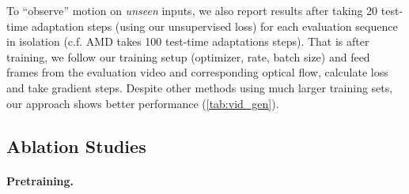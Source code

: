To ``observe'' motion on \emph{unseen} inputs, we also report results after taking 20 test-time adaptation steps (using our unsupervised loss) for each evaluation sequence in isolation (c.f. AMD \cite{liu2021emergence} takes 100 test-time adaptations steps). That is after training, 
we follow our training setup (optimizer, rate, batch size) and feed frames from the evaluation video and corresponding optical flow, calculate loss and take gradient steps. 
Despite other methods using much larger training sets, our approach shows better performance (\cref{tab:vid_gen}). 



\subsection{Ablation Studies}\label{sup:ablation}

\paragraph{Pretraining.}\label{sup:pretraining}

